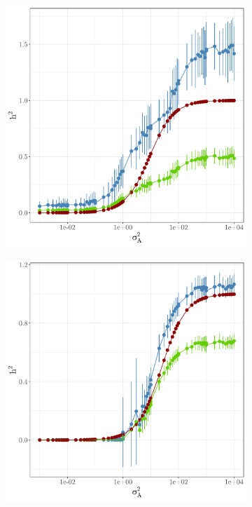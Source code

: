 \begin{figure}
    \centering
    \begin{subfigure}{0.49\textwidth}
    \caption{}
        \includegraphics[width=\linewidth]{figures/simulation_deviance_fixedeffects_beta10_unbalanced.pdf}
    \end{subfigure}
    \begin{subfigure}{0.49\textwidth}
    \caption{}
        \includegraphics[width=\linewidth]{figures/simulation_deviance_fixedeffects_beta10.pdf}

\end{subfigure}
\end{figure}
